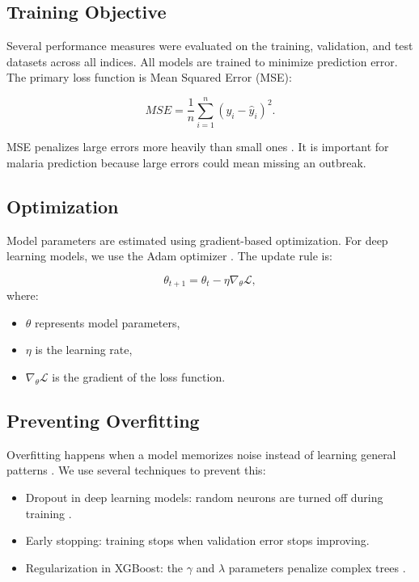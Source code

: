 \subsection{Training Objective}

Several performance measures were evaluated on the training, validation, and test datasets across all indices. All models are trained to minimize prediction error. The primary loss function is Mean Squared Error (MSE):

\[
MSE = \frac{1}{n} \sum_{i=1}^{n} (y_i - \hat{y}_i)^2.
\]

MSE penalizes large errors more heavily than small ones \cite{Hastie2009} . It is important for malaria prediction because large errors could mean missing an outbreak.

\subsection{Optimization}

Model parameters are estimated using gradient-based optimization. For deep learning models, we use the Adam optimizer \cite{Goodfellow-et-al-2016} . The update rule is:

\[
\theta_{t+1} = \theta_t - \eta \nabla_{\theta} \mathcal{L},
\]
where:
\begin{itemize}
	\item $\theta$ represents model parameters,
	\item $\eta$ is the learning rate,
	\item $\nabla_{\theta} \mathcal{L}$ is the gradient of the loss function.
\end{itemize}


\subsection{Preventing Overfitting}

Overfitting happens when a model memorizes noise instead of learning general patterns \cite{Hastie2009}. We use several techniques to prevent this:

\begin{itemize}
	\item Dropout in deep learning models: random neurons are turned off during training \cite{Goodfellow-et-al-2016}.
	\item Early stopping: training stops when validation error stops improving.
	\item Regularization in XGBoost: the \(\gamma\) and \(\lambda\) parameters penalize complex trees \cite{Syafei2023}.
\end{itemize}

